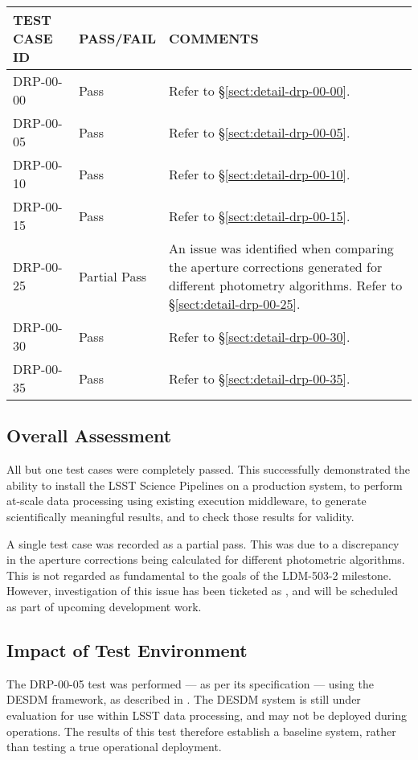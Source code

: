 \documentclass[DM,STR,toc]{lsstdoc}
\begin{document}
\begin{longtable} {|p{}|p{}|p{}|}\hline
{\bf TEST CASE ID} & {\bf PASS/FAIL} & {\bf COMMENTS} \\\hline
DRP-00-00 & Pass & Refer to \S\ref{sect:detail-drp-00-00}. \\\hline
DRP-00-05 & Pass & Refer to \S\ref{sect:detail-drp-00-05}. \\\hline
DRP-00-10 & Pass & Refer to \S\ref{sect:detail-drp-00-10}. \\\hline
DRP-00-15 & Pass & Refer to \S\ref{sect:detail-drp-00-15}. \\\hline
DRP-00-25 & Partial Pass & An issue was identified when comparing the aperture corrections generated for different photometry algorithms. Refer to \S\ref{sect:detail-drp-00-25}. \\\hline
DRP-00-30 & Pass & Refer to \S\ref{sect:detail-drp-00-30}. \\\hline
DRP-00-35 & Pass & Refer to \S\ref{sect:detail-drp-00-35}. \\\hline
\end{longtable}

\subsection{Overall Assessment}
\label{sect:overallassessment}

All but one test cases were completely passed.
This successfully demonstrated the ability to install the LSST Science Pipelines on a production system, to perform at-scale data processing using existing execution middleware, to generate scientifically meaningful results, and to check those results for validity.

A single test case was recorded as a partial pass.
This was due to a discrepancy in the aperture corrections being calculated for different photometric algorithms.
This is not regarded as fundamental to the goals of the LDM-503-2 milestone.
However, investigation of this issue has been ticketed as , and will be scheduled as part of upcoming development work.

\subsection{Impact of Test Environment}
\label{sect:impact}

The DRP-00-05 test was performed --- as per its specification --- using the DESDM framework, as described in .
The DESDM system is still under evaluation for use within LSST data processing, and may not be deployed during operations.
The results of this test therefore establish a baseline system, rather than testing a true operational deployment.
\end{document}
